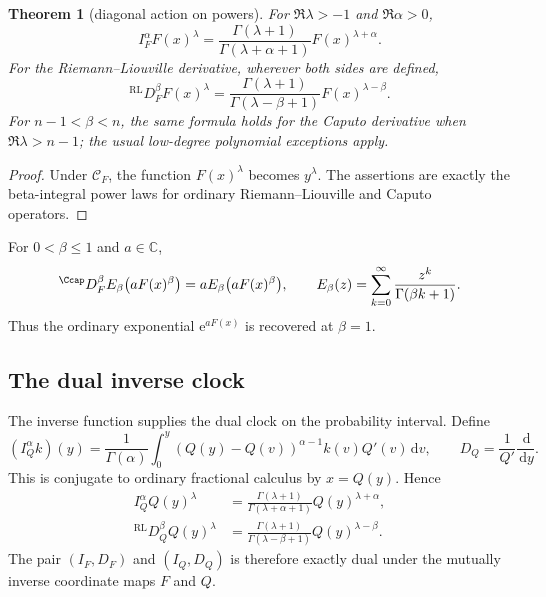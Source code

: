 \documentclass[11pt,oneside]{article}
\newtheorem{theorem}{Theorem}[section]
\theoremstyle{definition}
\theoremstyle{remark}
\newcommand{\C}{\mathbb C}
\newcommand{\dd}{\,\mathrm d}
\newcommand{\e}{\mathrm e}
\newcommand{\1}{\mathbf 1}
\begin{document}
\begin{theorem}[diagonal action on powers]
For $\Re\lambda>-1$ and $\Re\alpha>0$,
\begin{equation}
 I_F^\alpha F(x)^\lambda
 =\frac{\Gamma(\lambda+1)}{\Gamma(\lambda+\alpha+1)}
  F(x)^{\lambda+\alpha}.
 \label{p9:eq:F-clock-power-integral}
\end{equation}
For the Riemann--Liouville derivative, wherever both sides are defined,
\begin{equation}
 {}^{\mathrm{RL}}D_F^\beta F(x)^\lambda
 =\frac{\Gamma(\lambda+1)}{\Gamma(\lambda-\beta+1)}
  F(x)^{\lambda-\beta}.
 \label{p9:eq:F-clock-power-RL}
\end{equation}
For $n-1<\beta<n$, the same formula holds for the Caputo derivative when
$\Re\lambda>n-1$; the usual low-degree polynomial exceptions apply.
\end{theorem}

\begin{proof}
Under $\mathcal C_F$, the function $F(x)^\lambda$ becomes $y^\lambda$.
The assertions are exactly the beta-integral power laws for ordinary
Riemann--Liouville and Caputo operators.
\end{proof}

\begin{corollary}
For $0<\beta\le1$ and $a\in\C$,
\begin{equation}
 {}^{\Ccap}D_F^\beta
 E_\beta\bigl(aF(x)^\beta\bigr)
 =aE_\beta\bigl(aF(x)^\beta\bigr),
 \qquad
 E_\beta(z)=\sum_{k=0}^{\infty}\frac{z^k}{\Gamma(\beta k+1)}.
 \label{p9:eq:F-clock-Mittag}
\end{equation}
Thus the ordinary exponential $\e^{aF(x)}$ is recovered at $\beta=1$.
\end{corollary}

\subsection{The dual inverse clock}

The inverse function supplies the dual clock on the probability interval.
Define
\begin{equation}
 (I_Q^\alpha k)(y)
 =\frac1{\Gamma(\alpha)}
  \int_0^y(Q(y)-Q(v))^{\alpha-1}k(v)Q'(v)\dd v,
 \qquad
 D_Q=\frac1{Q'}\frac{\dd}{\dd y}.
 \label{p9:eq:IQ-DQ}
\end{equation}
This is conjugate to ordinary fractional calculus by $x=Q(y)$.  Hence
\begin{align}
 I_Q^\alpha Q(y)^\lambda
 &=\frac{\Gamma(\lambda+1)}{\Gamma(\lambda+\alpha+1)}
 Q(y)^{\lambda+\alpha},
 \label{p9:eq:Q-clock-power-I}\\
 {}^{\mathrm{RL}}D_Q^\beta Q(y)^\lambda
 &=\frac{\Gamma(\lambda+1)}{\Gamma(\lambda-\beta+1)}
 Q(y)^{\lambda-\beta}.
 \label{p9:eq:Q-clock-power-D}
\end{align}
The pair $(I_F,D_F)$ and $(I_Q,D_Q)$ is therefore exactly dual under the
mutually inverse coordinate maps $F$ and $Q$.
\end{document}

